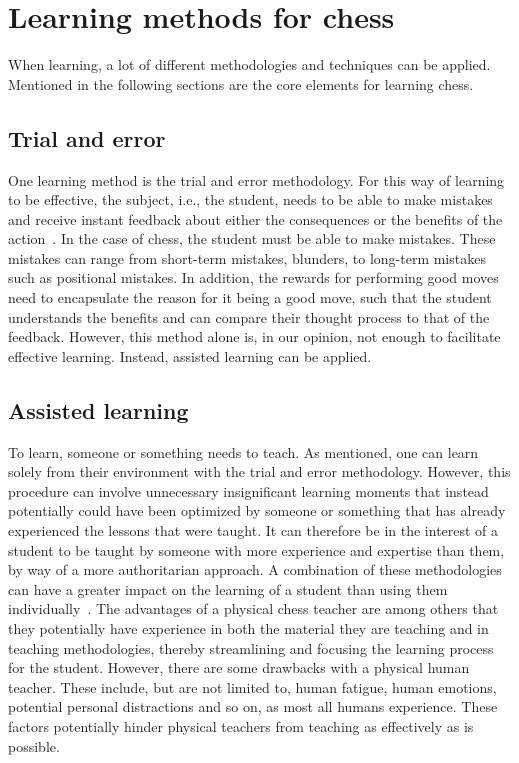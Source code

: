 \section{Learning methods for chess}\label{sec:learning-methods-for-chess}

When learning, a lot of different methodologies and techniques can be applied.
Mentioned in the following sections are the core elements for learning chess.


\subsection{Trial and error}\label{subsec:trial-and-error}

One learning method is the trial and error methodology.
For this way of learning to be effective, the subject, i.e., the student, needs to be able to make mistakes and receive
instant feedback about either the consequences or the benefits of the action~\cite{li2023}.
In the case of chess, the student must be able to make mistakes.
These mistakes can range from short-term mistakes, blunders, to long-term mistakes such as positional mistakes.
In addition, the rewards for performing good moves need to encapsulate the reason for it being a good move, such that
the student understands the benefits and can compare their thought process to that of the feedback.
However, this method alone is, in our opinion, not enough to facilitate effective learning.
Instead, assisted learning can be applied.


\subsection{Assisted learning}\label{subsec:assisted-learning}

To learn, someone or something needs to teach.
As mentioned, one can learn solely from their environment with the trial and error methodology.
However, this procedure can involve unnecessary insignificant learning moments that instead potentially could have been
optimized by someone or something that has already experienced the lessons that were taught.
It can therefore be in the interest of a student to be taught by someone with more experience and expertise than them,
by way of a more authoritarian approach.
A combination of these methodologies can have a greater impact on the learning of a student than using them
individually~\cite{swann2012}.
The advantages of a physical chess teacher are among others that they potentially have experience in both the material
they are teaching and in teaching methodologies, thereby streamlining and focusing the learning process for the student.
However, there are some drawbacks with a physical human teacher.
These include, but are not limited to, human fatigue, human emotions, potential personal distractions and so on,
as most all humans experience.
These factors potentially hinder physical teachers from teaching as effectively as is possible.

